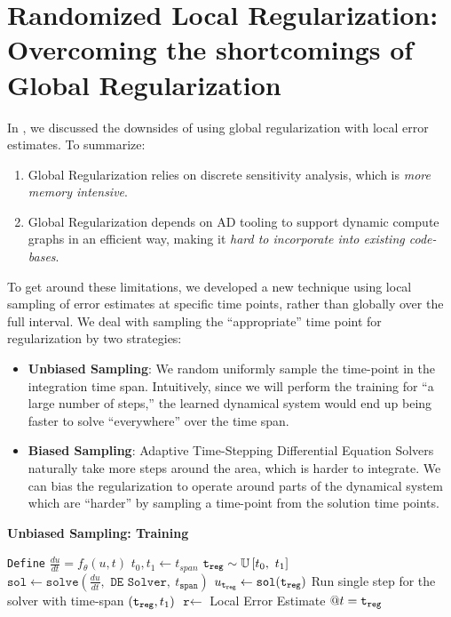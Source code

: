 \section{Randomized Local Regularization: Overcoming the shortcomings of Global Regularization}
\label{sec:randomized_local_regularization_overcoming_the_shortcomings_of_global_regularization}


In , we discussed the downsides of using global regularization with local error estimates. To summarize:
%
\begin{enumerate}
  \item Global Regularization relies on discrete sensitivity analysis, which is \textit{more memory intensive}.

  \item Global Regularization depends on AD tooling to support dynamic compute graphs in an efficient way, making it \textit{hard to incorporate into existing code-bases}.
\end{enumerate}
%
To get around these limitations, we developed a new technique using local sampling of error estimates at specific time points, rather than globally over the full interval. We deal with sampling the ``appropriate'' time point for regularization by two strategies:
%
\begin{itemize}
  \item \textbf{ Unbiased Sampling}: We random uniformly sample the time-point in the integration time span. Intuitively, since we will perform the training for ``a large number of steps,'' the learned dynamical system would end up being faster to solve ``everywhere'' over the time span.

  \item \textbf{ Biased Sampling}: Adaptive Time-Stepping Differential Equation Solvers naturally take more steps around the area, which is harder to integrate. We can bias the regularization to operate around parts of the dynamical system which are ``harder'' by sampling a time-point from the solution time points.
\end{itemize}
%

\begin{algorithm}[t]
  \caption{\textbf{Unbiased Sampling: Training}}
  \label{alg:local_regularization_unbiased_sampling}
  \begin{algorithmic}[1]
    \State \texttt{Define} $\frac{du}{dt} = f_\theta(u, t)$
    \State $t_0, t_1 \gets t_{span}$
    \State $\texttt{t}_{\texttt{reg}} \sim \mathbb{U}\left[t_0,~t_1\right]$
    \State $\texttt{sol} \gets \texttt{solve}(\frac{du}{dt}, \texttt{ DE Solver},~t_{\texttt{span}})$
    \State $u_{\texttt{t}_{\texttt{reg}}} \gets \texttt{sol}(\texttt{t}_{\texttt{reg}})$
    \State Run single step for the solver with time-span $(\texttt{t}_{\texttt{reg}}, t_1)$
    \State $\texttt{r} \gets $ Local Error Estimate $@ t=\texttt{t}_{\texttt{reg}}$
    \State {}
    \EndFunction
  \end{algorithmic}
\end{algorithm}

